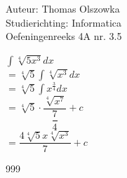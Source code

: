 \documentclass[a4paper]{article}
\newcommand{\dint}{\displaystyle\int}
\newcommand{\fourthroot}{\sqrt[4]}
\begin{document}
\noindent \large Auteur: Thomas Olszowka \\
\noindent \large Studierichting: Informatica \\
\noindent \large Oefeningenreeks 4A nr. 3.5  \\



\medskip

\normalsize

$\dint \fourthroot{5x^3} dx$ \\

$= \fourthroot{5} \dint \fourthroot{x^3} dx$ \\

$= \fourthroot{5} \dint x^{\tfrac{3}{4}} dx$ \\

$= \fourthroot{5} \cdot \dfrac{\fourthroot{x^7}}{\dfrac{7}{4}} + c$ \\

$= \dfrac{4\fourthroot{5} x \fourthroot{x^3}}{7} + c$ \\

\begin{thebibliography}{999}
\end{thebibliography}
\end{document}

